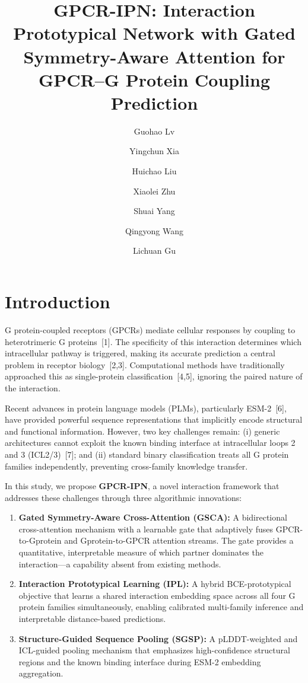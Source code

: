 \documentclass[unnumsec,webpdf,contemporary,large,numbered]{oup-authoring-template}
\title[GPCR-IPN for GPCR--G protein coupling prediction]{GPCR-IPN: Interaction Prototypical Network with Gated Symmetry-Aware Attention for GPCR--G Protein Coupling Prediction}
\author[1,2]{Guohao Lv}\author[1,2]{Yingchun Xia}\author[1,2]{Huichao Liu}
\author[1,2]{Xiaolei Zhu}\author[1,2]{Shuai Yang}
\author[1,2,$\ast$]{Qingyong Wang}\author[1,2,$\ast$]{Lichuan Gu}
\begin{document}
\maketitle

\section{Introduction}

G protein-coupled receptors (GPCRs) mediate cellular responses by coupling to heterotrimeric G proteins~[1]. The specificity of this interaction determines which intracellular pathway is triggered, making its accurate prediction a central problem in receptor biology~[2,3]. Computational methods have traditionally approached this as single-protein classification~[4,5], ignoring the paired nature of the interaction.

Recent advances in protein language models (PLMs), particularly ESM-2~[6], have provided powerful sequence representations that implicitly encode structural and functional information. However, two key challenges remain: (i) generic architectures cannot exploit the known binding interface at intracellular loops 2 and 3 (ICL2/3)~[7]; and (ii) standard binary classification treats all G protein families independently, preventing cross-family knowledge transfer.

In this study, we propose \textbf{GPCR-IPN}, a novel interaction framework that addresses these challenges through three algorithmic innovations:

\begin{enumerate}[leftmargin=*]
    \item \textbf{Gated Symmetry-Aware Cross-Attention (GSCA):} A bidirectional cross-attention mechanism with a learnable gate that adaptively fuses GPCR-to-Gprotein and Gprotein-to-GPCR attention streams. The gate provides a quantitative, interpretable measure of which partner dominates the interaction---a capability absent from existing methods.
    \item \textbf{Interaction Prototypical Learning (IPL):} A hybrid BCE-prototypical objective that learns a shared interaction embedding space across all four G protein families simultaneously, enabling calibrated multi-family inference and interpretable distance-based predictions.
    \item \textbf{Structure-Guided Sequence Pooling (SGSP):} A pLDDT-weighted and ICL-guided pooling mechanism that emphasizes high-confidence structural regions and the known binding interface during ESM-2 embedding aggregation.
\end{enumerate}
\end{document}

